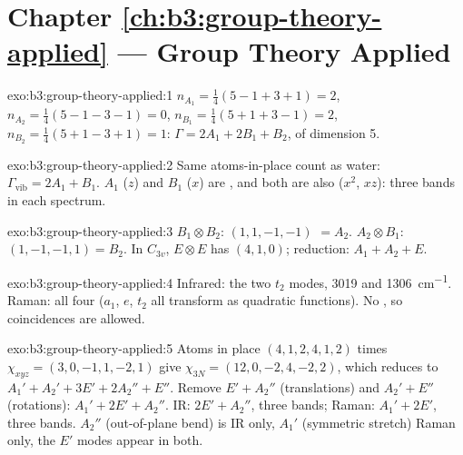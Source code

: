 \section*{Chapter \ref{ch:b3:group-theory-applied} --- Group Theory Applied}

\begin{solution}{exo:b3:group-theory-applied:1}
$n_{A_1} = \frac14(5 - 1 + 3 + 1) = 2$, $n_{A_2} = \frac14(5 - 1 - 3 - 1) = 0$,
$n_{B_1} = \frac14(5 + 1 + 3 - 1) = 2$, $n_{B_2} = \frac14(5 + 1 - 3 + 1) = 1$:
$\Gamma = 2A_1 + 2B_1 + B_2$, of dimension 5.
\end{solution}

\begin{solution}{exo:b3:group-theory-applied:2}
Same atoms-in-place count as water: $\Gamma_{\mathrm{vib}} = 2A_1 + B_1$. $A_1$ ($z$) and
$B_1$ ($x$) are , and both are also  ($x^2$, $xz$): three
bands in each spectrum.
\end{solution}

\begin{solution}{exo:b3:group-theory-applied:3}
$B_1\otimes B_2$:  $(1, 1, -1, -1)$ $= A_2$. $A_2\otimes B_1$: $(1, -1, -1,
1) = B_2$. In $C_{3v}$, $E\otimes E$ has  $(4, 1, 0)$; reduction: $A_1 + A_2 +
E$.
\end{solution}

\begin{solution}{exo:b3:group-theory-applied:4}
Infrared: the two $t_2$ modes, 3019 and \qty{1306}{cm^{-1}}. Raman: all four ($a_1$,
$e$, $t_2$ all transform as quadratic functions). No , so
coincidences are allowed.
\end{solution}

\begin{solution}{exo:b3:group-theory-applied:5}
Atoms in place $(4, 1, 2, 4, 1, 2)$ times $\chi_{xyz} = (3, 0, -1, 1, -2, 1)$ give
$\chi_{3N} = (12, 0, -2, 4, -2, 2)$, which reduces to $A_1' + A_2' + 3E' + 2A_2'' +
E''$. Remove $E' + A_2''$ (translations) and $A_2' + E''$ (rotations): $A_1' + 2E'
+ A_2''$. IR: $2E' + A_2''$, three bands; Raman: $A_1' + 2E'$, three bands. $A_2''$
(out-of-plane bend) is IR only, $A_1'$ (symmetric stretch) Raman only, the $E'$
modes appear in both.
\end{solution}

